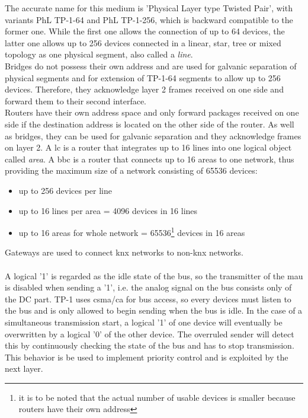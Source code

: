 The accurate name for this medium is 'Physical Layer type Twisted Pair', with variants
PhL \gls{TP}-1-64 and PhL \gls{TP}-1-256, which is backward compatible to the former one. While the first one allows
the connection of up to 64 devices, the latter one allows up to 256 devices connected in a linear, star, tree or
mixed topology as one physical segment, also called a \textit{line}.
\\
Bridges do not possess their own address and are used for galvanic separation of physical segments and for extension of TP-1-64 segments to allow up to 256 devices.
Therefore, they acknowledge layer 2 frames received on one side and forward them to their second interface. 
\\
Routers have their own address space and only forward packages received on one side if the destination address is located on the other side of the router.
As well as bridges, they can be used for galvanic separation and they acknowledge frames on layer 2.
A \gls{lc} is a router that integrates up to 16 lines into one logical object called \textit{area}. A \gls{bbc} is a router that connects
up to 16 areas to one network, thus providing the maximum size of a network consisting of 65536 devices:
\begin{itemize}
 \item up to 256 devices per line
 \item up to 16 lines per area = 4096 devices in 16 lines
 \item up to 16 areas for whole network = 65536\footnote{it is to be noted that the actual number of usable devices is smaller because routers have
 their own address} devices in 16 areas
\end{itemize}
Gateways are used to connect \gls{knx} networks to non-\gls{knx} networks.
\\
\\
A logical '1' is regarded as the idle state of the bus, so the transmitter of the \gls{mau} is disabled when sending a '1', i.e. the analog signal on
the bus consists only of the DC part. \gls{TP}-1 uses \gls{csma}/\gls{ca} for bus access, so every devices must listen to the bus and is only allowed
to begin sending when the bus is idle. In the case of a simultaneous transmission start, a logical '1' of one
device will eventually be overwritten by a logical '0' of the other device. The overruled
sender will detect this by continuously checking the state of the bus and has to stop 
transmission. This behavior is be used to implement priority control and is exploited by the next layer.

